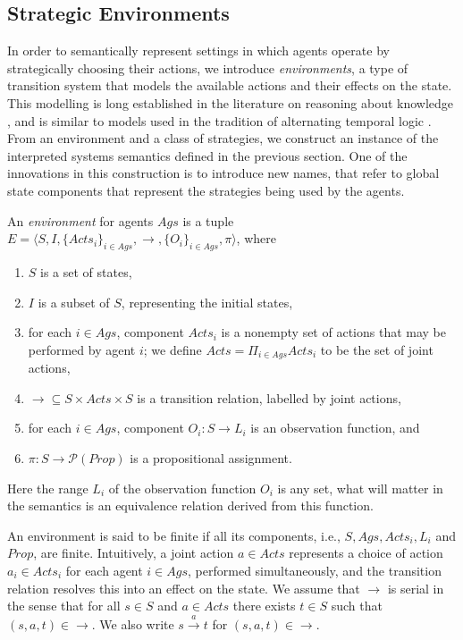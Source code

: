 \documentclass[a4wide]{article}
\newcommand{\trans}{\rightarrow}
\newcommand{\ptrans}[1]{\stackrel{#1}{\longrightarrow}}
\newcommand{\Prop}{Prop}
\theoremstyle{examplesty}
\newcommand{\Ags}{\mathit{Ags}}
\newcommand{\Env}{E}
\newcommand{\Acts}{\mathit{Acts}}
\newcommand{\be}{\begin{enumerate}}
\newcommand{\ee}{\end{enumerate}}
\begin{document}
\subsection{Strategic Environments}\label{sec:stratenv}

In order to semantically represent settings in which  agents operate  by strategically choosing their
actions, 
we introduce 
\emph{environments}, 
a type of transition system that models the available actions
and their effects on the state.  
This modelling is long established in the literature on reasoning about knowledge \cite{MeydenTARK96}, 
and is similar to models used in the tradition of alternating temporal logic \cite{ATLJACM}. 
From an environment and a class of strategies, we construct
an instance of the 
interpreted systems semantics defined in the previous section. 
One of the innovations in this
construction is to introduce new names, that refer to global state components that
represent the strategies being used by the agents. 

An {\em environment} for agents $\Ags$  is a tuple 
$\Env =  \langle S, I, \{\Acts_i\}_{i\in \Ags}, \trans, \{O_i\}_{i\in \Ags}, \pi\rangle$, where 
\be \item 
$S$ is a set of states, 
\item 
$I$ is a subset of $S$, representing the initial states, 
\item 
for each $i \in \Ags$, component $\Acts_i$ is a  nonempty set of actions
that may be performed by agent $i$; 
we define $\Acts = \Pi_{i\in Ags} \Acts_i$ to be the set of 
joint actions, 
\item 
$\trans \subseteq S \times \Acts \times S$ is a transition relation, 
labelled by joint actions, 
\item 
for each $i\in \Ags$, 
component $O_i: S\rightarrow L_i$ is 
an observation function, 
and 
\item 
$\pi: S\rightarrow \mathcal{ P}(\Prop)$ is a propositional assignment. 
\ee
Here the range $L_i$ of the observation function $O_i$ is any set, what will matter in the semantics
is an equivalence relation derived from this function. 

An environment is said to be finite if all its components, i.e., $S, \Ags, \Acts_i, L_i$ and $\Prop$, are finite. 
Intuitively, a joint action $a\in \Acts$ represents a choice of action $a_i\in \Acts_i$ for each agent $i\in \Ags$, 
performed simultaneously, and the transition relation resolves this into an effect on the 
state. We assume that $\trans$ is serial in the sense that for all $s\in S$ and 
$a \in \Acts$ there exists $t\in S$ such that $(s,a, t)\in\trans$. 
We also write $s\ptrans{a}t$ for $(s,a, t)\in\trans$. 
\end{document}
